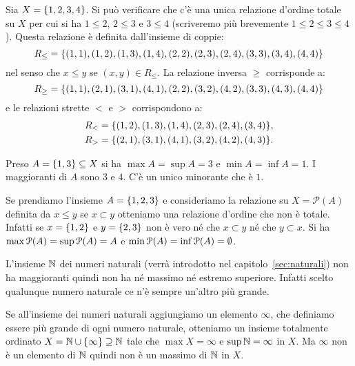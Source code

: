 \begin{example} 
  Sia $X=\ENCLOSE{1,2,3,4}$. 
  Si può verificare che c'è una unica relazione d'ordine totale
  su $X$ per cui si ha $1 \le 2$, $2 \le 3$ e $3 \le 4$
  (scriveremo più brevemente $1 \le 2 \le 3 \le 4$).
  Questa relazione è definita dall'insieme di coppie:
  \[
    R_\le = \ENCLOSE{
          (1,1),(1,2),(1,3),(1,4),
          (2,2),(2,3),(2,4),
          (3,3),(3,4),
          (4,4)}
  \]
  nel senso che $x\le y$ se $(x,y)\in R_\le$.
  La relazione inversa $\ge$ corrisponde a:
  \[
    R_\ge = \ENCLOSE{
          (1,1),(2,1),(3,1),(4,1),
          (2,2),(3,2),(4,2),
          (3,3),(4,3),
          (4,4)}
  \]
  e le relazioni strette $<$ e $>$ corrispondono a:
  \begin{align*}
    R_< &= \ENCLOSE{
          (1,2),(1,3),(1,4),
          (2,3),(2,4),
          (3,4)}, \\
    R_> &= \ENCLOSE{
          (2,1),(3,1),(4,1),
          (3,2),(4,2),
          (4,3)}.
  \end{align*}

  Preso $A=\ENCLOSE{1,3}\subset X$ si ha $\max A = \sup A = 3$ e 
  $\min A = \inf A = 1$.
  I maggioranti di $A$ sono $3$ e $4$. 
  C'è un unico minorante che è $1$.
\end{example}

\begin{example}
Se prendiamo l'insieme $A=\ENCLOSE{1,2,3}$ e consideriamo la relazione
su $X=\mathcal P(A)$ definita da $x\le y$ se $x\subset y$ otteniamo una relazione 
d'ordine che non è totale. 
Infatti se $x=\ENCLOSE{1,2}$ e $y=\ENCLOSE{2,3}$ non è vero né che $x\subset y$ 
né che $y\subset x$.
Si ha $\max \P(A) = \sup \P(A) = A$ e $\min \P(A) = \inf \P(A) = \emptyset$.
\end{example}

\begin{example}
L'insieme $\NN$ dei numeri naturali (verrà introdotto nel capitolo~\ref{sec:naturali}) non ha maggioranti 
quindi non ha né massimo né estremo superiore. 
Infatti scelto 
qualunque numero naturale ce n'è sempre un'altro più grande.

Se all'insieme dei numeri naturali aggiungiamo un elemento $\infty$,
che definiamo essere più grande di ogni numero naturale, 
otteniamo un insieme totalmente ordinato $X=\NN\cup\ENCLOSE{\infty}\supset \NN$
tale che $\max X = \infty$ e $\sup \NN = \infty$ in $X$.
Ma $\infty$ non è un elemento di $\NN$ quindi non è un massimo di $\NN$ in $X$.
\end{example}

